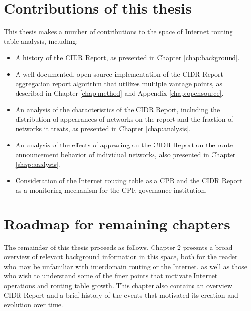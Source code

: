\section{Contributions of this thesis}

This thesis makes a number of contributions to the space of Internet routing
table analysis, including:

\begin{itemize}
    \item{A history of the CIDR Report, as presented in Chapter
    \ref{chap:background}.}
    \item{A well-documented, open-source implementation of the CIDR Report
    aggregation report algorithm that utilizes multiple vantage points, as
    described in Chapter \ref{chap:method} and Appendix \ref{chap:opensource}.}
    \item{An analysis of the characteristics of the CIDR Report, including the
    distribution of appearances of networks on the report and the fraction of
    networks it treats, as presented in Chapter \ref{chap:analysis}.}
    \item{An analysis of the effects of appearing on the CIDR Report on the
    route announcement behavior of individual networks, also presented in
    Chapter \ref{chap:analysis}.}
    \item{Consideration of the Internet routing table as a CPR and the CIDR
    Report as a monitoring mechanism for the CPR governance institution.}
\end{itemize}

\section{Roadmap for remaining chapters}

The remainder of this thesis proceeds as follows. Chapter 2 presents a broad
overview of relevant background information in this space, both for the reader
who may be unfamiliar with interdomain routing or the Internet, as well as
those who wish to understand some of the finer points that motivate Internet
operations and routing table growth. This chapter also contains an overview
CIDR Report and a brief history of the events that motivated its creation and
evolution over time.

